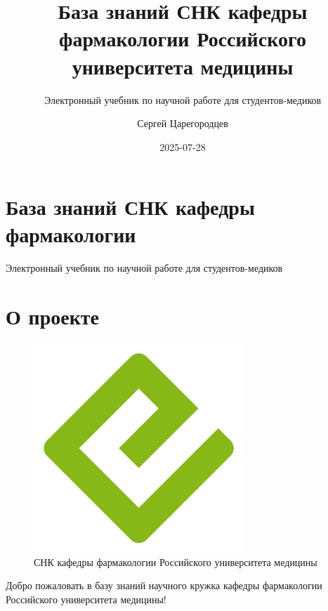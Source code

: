 \documentclass[
  russian,
  letterpaper,
]{book}
\title{База знаний СНК кафедры фармакологии Российского университета
медицины}
\subtitle{Электронный учебник по научной работе для студентов-медиков}
\author{Сергей Царегородцев}
\date{2025-07-28}
\renewcommand*\contentsname{Содержание}
\newcommand\contentsname{Содержание}
\begin{document}
\frontmatter
\maketitle

\renewcommand*\contentsname{Содержание}
{
\setcounter{tocdepth}{2}
\tableofcontents
}

\mainmatter
{}

\chapter{База знаний СНК кафедры
фармакологии}\label{ux431ux430ux437ux430-ux437ux43dux430ux43dux438ux439-ux441ux43dux43a-ux43aux430ux444ux435ux434ux440ux44b-ux444ux430ux440ux43cux430ux43aux43eux43bux43eux433ux438ux438}

Электронный учебник по научной работе для студентов-медиков

\hfill\break


\chapter{О проекте}\label{sec-about}

\begin{figure}[H]

{\centering \includegraphics[width=3.125in,height=\textheight,keepaspectratio]{cover.png}

}

\caption{СНК кафедры фармакологии Российского университета медицины}

\end{figure}%

Добро пожаловать в базу знаний научного кружка кафедры фармакологии
Российского университета медицины!
\end{document}
